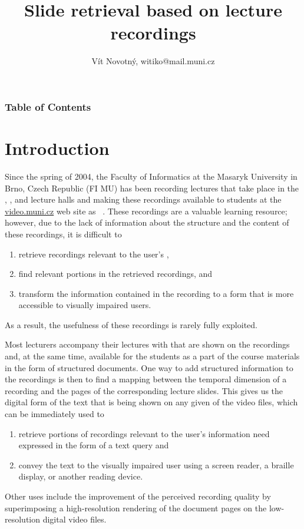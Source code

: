 \title[Lecture slide retrieval]{Slide retrieval based on lecture recordings}
\author[V.\,Novotný]{Vít Novotný, witiko@mail.muni.cz}
\subject{Project report}

\maketitle

\begin{frame}
\frametitle<presentation>{Table of Contents}
\tableofcontents
\end{frame}

\section{Introduction}
Since the spring of 2004, the Faculty of Informatics at the Masaryk University
in Brno, Czech Republic (FI MU) has been recording lectures that take place in
the , , and  lecture halls and making these
recordings available to students at the
\href{https://www.video.muni.cz}{video.muni.cz} web site as ~\cite{hladkaliska03lectures}. These recordings are a valuable learning
resource; however, due to the lack of information about the structure and the
content of these recordings, it is difficult to
\begin{enumerate}
\item retrieve recordings relevant to the user's ,
\item find relevant portions in the retrieved recordings, and
\item transform the information contained in the recording to a form that is more
  accessible to visually impaired users.
\end{enumerate}
As a result, the usefulness of these recordings is rarely fully exploited.

Most lecturers accompany their lectures with  that are shown
on the recordings and, at the same time, available for the students as a part of
the course materials in the form of structured  documents. One way to
add structured information to the recordings is then to find a mapping between the
temporal dimension of a recording and the pages of the corresponding lecture
slides. This gives us the digital form of the text that is being shown on any
given  of the video files, which can be immediately used to
\begin{enumerate}
\item retrieve portions of recordings relevant to the user's information need
  expressed in the form of a text query and
\item convey the text to the visually impaired user using a screen reader, a
  braille display, or another reading device.
\end{enumerate}
Other uses include the improvement of the perceived recording quality by
superimposing a high-resolution rendering of the  document pages on
the low-resolution digital video files.

